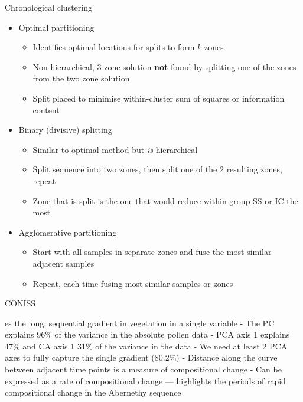 \documentclass[10pt,ignorenonframetext,compress, aspectratio=169]{beamer}
\providecommand{\tightlist}{%
  \setlength{\itemsep}{0pt}\setlength{\parskip}{0pt}}
\begin{document}
\begin{frame}{Chronological clustering}

\begin{itemize}
\tightlist
\item
  Optimal partitioning

  \begin{itemize}
  \tightlist
  \item
    Identifies optimal locations for splits to form \(k\) zones
  \item
    Non-hierarchical, 3 zone solution \textbf{not} found by splitting
    one of the zones from the two zone solution
  \item
    Split placed to minimise within-cluster sum of squares or
    information content
  \end{itemize}
\item
  Binary (divisive) splitting

  \begin{itemize}
  \tightlist
  \item
    Similar to optimal method but \textit{is} hierarchical
  \item
    Split sequence into two zones, then split one of the 2 resulting
    zones, repeat
  \item
    Zone that is split is the one that would reduce within-group SS or
    IC the most
  \end{itemize}
\item
  Agglomerative partitioning

  \begin{itemize}
  \tightlist
  \item
    Start with all samples in separate zones and fuse the most similar
    adjacent samples
  \item
    Repeat, each time fusing most similar samples or zones
  \end{itemize}
\end{itemize}

\end{frame}

\begin{frame}{CONISS}

es the long, sequential gradient in vegetation in a single variable -
The PC explains 96\% of the variance in the absolute pollen data - PCA
axis 1 explains 47\% and CA axis 1 31\% of the variance in the data - We
need at least 2 PCA axes to fully capture the single gradient (80.2\%) -
Distance along the curve between adjacent time points is a measure of
compositional change - Can be expressed as a rate of compositional
change --- highlights the periods of rapid compositional change in the
Abernethy sequence

\end{frame}
\end{document}
